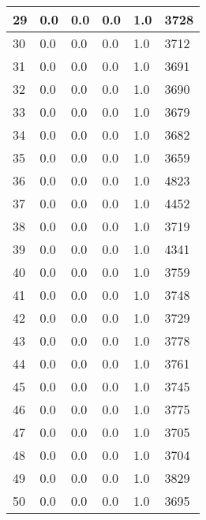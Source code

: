 \begin{longtable}{|l|l|l|l|l|l|}
29 & 0.0 & 0.0 & 0.0 & 1.0 & 3728 \\ \hline 
30 & 0.0 & 0.0 & 0.0 & 1.0 & 3712 \\ \hline 
31 & 0.0 & 0.0 & 0.0 & 1.0 & 3691 \\ \hline 
32 & 0.0 & 0.0 & 0.0 & 1.0 & 3690 \\ \hline 
33 & 0.0 & 0.0 & 0.0 & 1.0 & 3679 \\ \hline 
34 & 0.0 & 0.0 & 0.0 & 1.0 & 3682 \\ \hline 
35 & 0.0 & 0.0 & 0.0 & 1.0 & 3659 \\ \hline 
36 & 0.0 & 0.0 & 0.0 & 1.0 & 4823 \\ \hline 
37 & 0.0 & 0.0 & 0.0 & 1.0 & 4452 \\ \hline 
38 & 0.0 & 0.0 & 0.0 & 1.0 & 3719 \\ \hline 
39 & 0.0 & 0.0 & 0.0 & 1.0 & 4341 \\ \hline 
40 & 0.0 & 0.0 & 0.0 & 1.0 & 3759 \\ \hline 
41 & 0.0 & 0.0 & 0.0 & 1.0 & 3748 \\ \hline 
42 & 0.0 & 0.0 & 0.0 & 1.0 & 3729 \\ \hline 
43 & 0.0 & 0.0 & 0.0 & 1.0 & 3778 \\ \hline 
44 & 0.0 & 0.0 & 0.0 & 1.0 & 3761 \\ \hline 
45 & 0.0 & 0.0 & 0.0 & 1.0 & 3745 \\ \hline 
46 & 0.0 & 0.0 & 0.0 & 1.0 & 3775 \\ \hline 
47 & 0.0 & 0.0 & 0.0 & 1.0 & 3705 \\ \hline 
48 & 0.0 & 0.0 & 0.0 & 1.0 & 3704 \\ \hline 
49 & 0.0 & 0.0 & 0.0 & 1.0 & 3829 \\ \hline 
50 & 0.0 & 0.0 & 0.0 & 1.0 & 3695 \\ \hline 
\end{longtable}